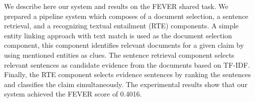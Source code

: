 We describe here our system and results on the FEVER shared task. We prepared a pipeline system which composes of a document selection, a sentence retrieval, and a recognizing textual entailment (RTE) components. A simple entity linking approach with text match is used as the document selection component,  this component identifies relevant documents for a given claim by using mentioned entities as clues. The sentence retrieval component selects relevant sentences as candidate evidence from the documents based on TF-IDF. Finally, the RTE component selects evidence sentences by ranking the sentences and classifies the claim simultaneously. The experimental results show that our system achieved the FEVER score of 0.4016.
